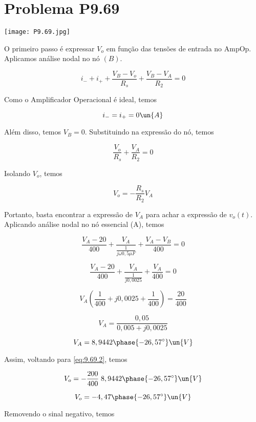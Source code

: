 \section*{Problema P9.69}

\renewcommand*\thesection{9.69}

\begin{center}
    \texttt{[image: P9.69.jpg]}
\end{center}

O primeiro passo é expressar $V_o$ em função das tensões de entrada no AmpOp.
Aplicamos análise nodal no nó $(B)$.

\[ i_- + i_+ + \frac{V_B - V_o}{R_s} + \frac{V_B - V_A}{R_2} = 0 \]

Como o Amplificador Operacional é ideal, temos

\begin{equation}\label{eq:9.69.1}
    i_- = i_+ = 0 \un{A}
\end{equation}

Além disso, temos $V_B = 0$. Substituindo na expressão do nó, temos

\[ \frac{V_o}{R_s} + \frac{V_A}{R_2} = 0 \]

Isolando $V_o$, temos

\begin{equation}\label{eq:9.69.2}
    V_o = -\frac{R_s}{R_2} V_A
\end{equation}

Portanto, basta encontrar a expressão de $V_A$ para achar a expressão de $v_o(t)$. \\
Aplicando análise nodal no nó essencial (A), temos

\[ \frac{V_A - 20}{400} + \frac{V_A}{\frac{1}{j\omega 0,5\mu F}} + \frac{V_A - V_B}{400} = 0 \]

\[ \frac{V_A - 20}{400} + \frac{V_A}{\frac{1}{j0,0025}} + \frac{V_A}{400} = 0 \]

\[ V_A\left(\frac{1}{400} + j0,0025 + \frac{1}{400}\right) = \frac{20}{400}\]

\[ V_A = \frac{0,05}{0,005 + j0,0025} \]

\[ V_A = 8,9442\phase{-26,57^{\circ}} \un{V} \]

Assim, voltando para \eqref{eq:9.69.2}, temos

\[ V_o = -\frac{200}{400} \; 8,9442\phase{-26,57^{\circ}} \un{V} \]

\[ V_o = -4,47\phase{-26,57^{\circ}} \un{V} \]

Removendo o sinal negativo, temos

